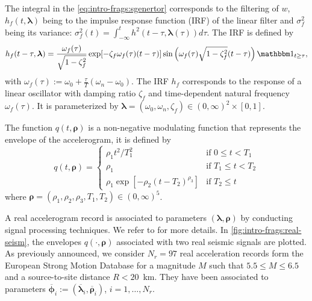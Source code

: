 
The integral in the \cref{eq:intro-frags:sgenertor} corresponds to the filtering of $w$, $h_f(t,\boldsymbol{\lambda})$ being to the impulse response function (IRF) of the linear filter and $\sigma_f^2$ being its variance: $\sigma_f^2(t)=\int_{-\infty}^th^2(t-\tau,\boldsymbol{\lambda}(\tau))d\tau$. The IRF is defined by
    \begin{equation}
        h_f(t-\tau,\boldsymbol{\lambda}) = \frac{\omega_f(\tau)}{\sqrt{1-\zeta^2_f}}\exp[-\zeta_f\omega_f(\tau)(t-\tau)]\sin\left(\omega_f(\tau)\sqrt{1-\zeta^2_f}(t-\tau)\right)\indic_{t\geq\tau},
    \end{equation}
with $\omega_f(\tau):=\omega_0+\frac{\tau}{T}(\omega_n-\omega_0)$. 
The IRF $h_f$ corresponds to the response of a linear oscillator with damping ratio $\zeta_f$ and time-dependent natural frequency $\omega_f(\tau)$. It is parameterized by $\boldsymbol{\lambda}=(\omega_0,\omega_n,\zeta_f)\in(0,\infty)^2\times[0,1]$.





 The function $q(t,\boldsymbol\rho)$ is a
 non-negative modulating function that represents the envelope of the accelerogram, it is defined by
    \begin{equation}
        q(t,\boldsymbol\rho) = \left\lbrace \begin{array}{ll}
            \rho_1t^2/T_1^2 & \text{if\ } 0\leq t< T_1 \\
            \rho_1 & \text{if\ }T_1\leq t< T_2\\
            \rho_1\exp\left[-\rho_2(t-T_2)^{\rho_3}\right] &\text{if\ }T_2\leq t
        \end{array}\right.
    \end{equation}
where $\boldsymbol\rho=(\rho_1,\rho_2,\rho_3,T_1,T_2)\in(0,\infty)^5$.


A real accelerogram record is associated to parameters $(\boldsymbol{\lambda},\boldsymbol{\rho})$ by conducting signal processing techniques. We refer to \cite{rezaeian_stochastic_2008} for more details.
In \cref{fig:intro-frags:real-seism}, the envelopes $q(\cdot,\boldsymbol{\rho})$ associated with two real seismic signals are plotted.
As previously announced,
we consider $N_r=97$ real acceleration records form the European Strong Motion Database for a magnitude $M$ such that $5.5\leq M\leq 6.5$ and a source-to-site distance $R<20$~km. They have been associated to parameters $\overline{\boldsymbol{\phi}}_i:=(\overline{\boldsymbol{\lambda}}_i,\overline{\boldsymbol{\rho}}_i)$, $i=1,\dots,N_r$.



